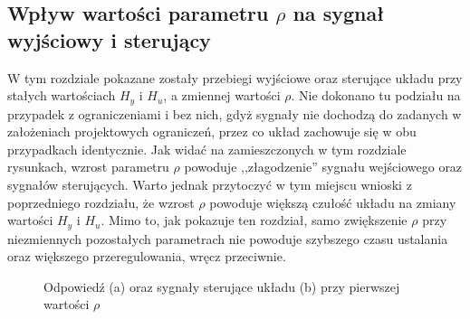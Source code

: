 \documentclass{article}
\begin{document}
\subsection{Wpływ wartości parametru $\rho$ na sygnał wyjściowy i sterujący}
W tym rozdziale pokazane zostały przebiegi wyjściowe oraz sterujące układu przy stałych wartościach $H_y$ i $H_u$, a zmiennej wartości $\rho$. Nie dokonano tu podziału na przypadek z ograniczeniami i bez nich, gdyż sygnały nie dochodzą do zadanych w założeniach projektowych ograniczeń, przez co układ zachowuje się w obu przypadkach identycznie.
\newline Jak widać na zamieszczonych w tym rozdziale rysunkach, wzrost parametru $\rho$ powoduje ,,złagodzenie'' sygnału wejściowego oraz sygnałów sterujących. Warto jednak przytoczyć w tym miejscu wnioski z poprzedniego rozdziału, że wzrost $\rho$ powoduje większą czułość układu na zmiany wartości $H_y$ i $H_u$. Mimo to, jak pokazuje ten rozdział, samo zwiększenie $\rho$ przy niezmiennych pozostałych parametrach nie powoduje szybszego czasu ustalania oraz większego przeregulowania, wręcz przeciwnie.

\begin{figure}[H]
    \centering
    \caption{Odpowiedź (a) oraz sygnały sterujące układu (b) przy pierwszej wartości $\rho$}
    \label{fig:1z}
\end{figure}
\end{document}
